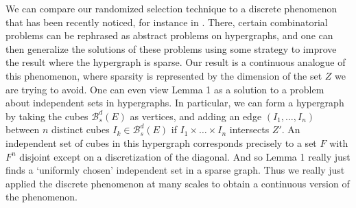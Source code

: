 \documentclass[usenames,dvipsnames]{article}
\theoremstyle{plain}
\theoremstyle{plain}
\begin{document}
We can compare our randomized selection technique to a discrete phenomenon that has been recently noticed, for instance in \cite{BaloghMorrisSamotij}. There, certain combinatorial problems can be rephrased as abstract problems on hypergraphs, and one can then generalize the solutions of these problems using some strategy to improve the result where the hypergraph is sparse. Our result is a continuous analogue of this phenomenon, where sparsity is represented by the dimension of the set $Z$ we are trying to avoid. One can even view Lemma 1 as a solution to a problem about independent sets in hypergraphs. In particular, we can form a hypergraph by taking the cubes $\mathcal{B}^d_s(E)$ as vertices, and adding an edge $(I_1, \dots, I_n)$ between $n$ distinct cubes $I_k \in \mathcal{B}^d_s(E)$ if $I_1 \times \dots \times I_n$ intersects $Z'$. An independent set of cubes in this hypergraph corresponds precisely to a set $F$ with $F^n$ disjoint except on a discretization of the diagonal. And so Lemma 1 really just finds a `uniformly chosen' independent set in a sparse graph. Thus we really just applied the discrete phenomenon at many scales to obtain a continuous version of the phenomenon.





\end{document}

